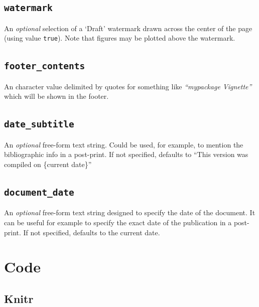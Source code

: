 \documentclass[letterpaper,9pt,twocolumn,twoside,]{pinp}
\begin{document}
\hypertarget{watermark}{%
\subsection{\texorpdfstring{\texttt{watermark}}{watermark}}\label{watermark}}

An \emph{optional} selection of a `Draft' watermark drawn across the
center of the page (using value \texttt{true}). Note that figures may be
plotted above the watermark.

\hypertarget{footer_contents}{%
\subsection{\texorpdfstring{\texttt{footer\_contents}}{footer\_contents}}\label{footer_contents}}

An character value delimited by quotes for something like
\emph{``mypackage Vignette''} which will be shown in the footer.

\hypertarget{date_subtitle}{%
\subsection{\texorpdfstring{\texttt{date\_subtitle}}{date\_subtitle}}\label{date_subtitle}}

An \emph{optional} free-form text string. Could be used, for example, to
mention the bibliographic info in a post-print. If not specified,
defaults to ``This version was compiled on \{current date\}''

\hypertarget{document_date}{%
\subsection{\texorpdfstring{\texttt{document\_date}}{document\_date}}\label{document_date}}

An \emph{optional} free-form text string designed to specify the date of
the document. It can be useful for example to specify the exact date of
the publication in a post-print. If not specified, defaults to the
current date.

\hypertarget{code}{%
\section{Code}\label{code}}

\hypertarget{knitr}{%
\subsection{Knitr}\label{knitr}}
\end{document}
